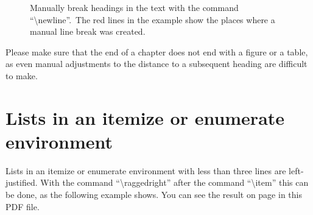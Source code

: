 
\begin{figure}[h]
	\caption{Manually break headings in the text with the command ``\textbackslash newline''.~The red lines in the example show the places where a manual line break was created.}
	\label{fig:wrap-headings-in-the-text}
\end{figure}

Please make sure that the end of a chapter does not end with a figure or a table, as even manual adjustments to the distance to a subsequent heading are difficult to make.





\section{Lists in an itemize or enumerate environment}
Lists in an itemize or enumerate environment with less than three lines are left-justified. With the com\-mand ``\textbackslash raggedright'' after the com\-mand ``\textbackslash item'' this can be done, as the following example shows.%
You can see the result %
on page \pageref{itm:example-itemize} in this PDF file.


